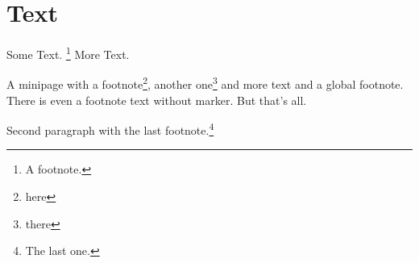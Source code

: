 \documentclass{article}
\begin{document}
\section{Text}

Some Text.%
\footnote{A footnote.}
More Text.
%
\begin{center}
  \begin{minipage}{0.5\columnwidth}
A minipage with a footnote\footnote{here}, another one\footnote{there}
and more text and a global footnote.\footnotemark{}
There is even a footnote text
without marker.
But that's all.
  \end{minipage}
\end{center}
%

Second paragraph with the last footnote.\footnote{The last one.}
\end{document}
